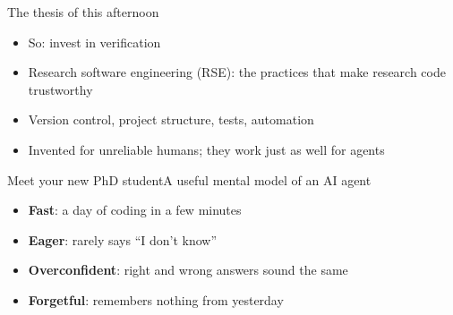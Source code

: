 \begin{frame}{The thesis of this afternoon}
  \vspace{4ex}
  \begin{center}
  \end{center}
  \vspace{3ex}

  \begin{itemize}
    \item<2-> So: invest in verification
    \item<3-> Research software engineering (RSE): the practices that make research
          code trustworthy
    \item<4-> Version control, project structure, tests, automation
    \item<5-> Invented for unreliable humans; they work just as well for agents
  \end{itemize}
\end{frame}

\begin{frame}{Meet your new PhD student}{A useful mental model of an AI agent}
  \begin{itemize}
    \item \textbf{Fast}: a day of coding in a few minutes
    \item \textbf{Eager}: rarely says ``I don't know''
    \item \textbf{Overconfident}: right and wrong answers sound the same
    \item \textbf{Forgetful}: remembers nothing from yesterday
  \end{itemize}

  \vspace{3ex}
\end{frame}

\outlineslide
